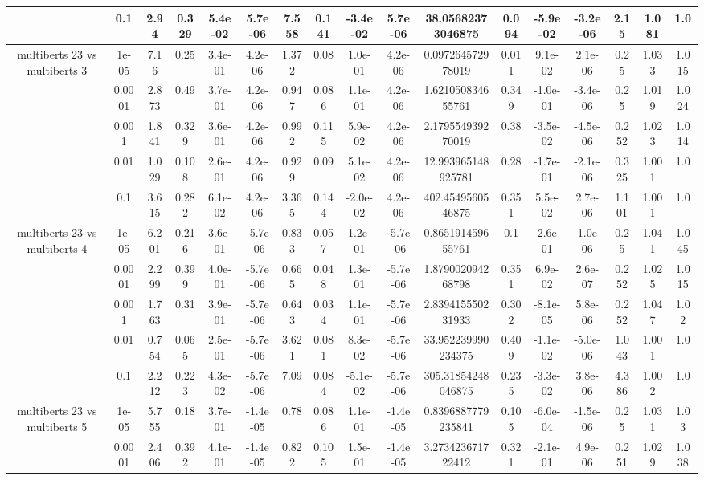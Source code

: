 \begin{tabular}{|c|c|c|c|c|c|c|c|c|c|c|c|c|c|c|c|c|}
 & 0.1 & 2.94 & 0.329 & 5.4e-02 & 5.7e-06 & 7.558 & 0.141 & -3.4e-02 & 5.7e-06 & 38.05682373046875 & 0.094 & -5.9e-02 & -3.2e-06 & 2.15 & 1.081 & 1.0 \\
\hline
\multirow{5}{*}{multiberts 23 vs multiberts 3} & 1e-05 & 7.16 & 0.25 & 3.4e-01 & 4.2e-06 & 1.372 & 0.08 & 1.0e-01 & 4.2e-06 & 0.097264572978019 & 0.011 & 9.1e-02 & 2.1e-06 & 0.25 & 1.033 & 1.015 \\
 & 0.0001 & 2.873 & 0.49 & 3.7e-01 & 4.2e-06 & 0.947 & 0.086 & 1.1e-01 & 4.2e-06 & 1.621050834655761 & 0.349 & -1.0e-01 & -3.4e-06 & 0.25 & 1.019 & 1.024 \\
 & 0.001 & 1.841 & 0.329 & 3.6e-01 & 4.2e-06 & 0.992 & 0.115 & 5.9e-02 & 4.2e-06 & 2.179554939270019 & 0.38 & -3.5e-02 & -4.5e-06 & 0.252 & 1.023 & 1.014 \\
 & 0.01 & 1.029 & 0.108 & 2.6e-01 & 4.2e-06 & 0.929 & 0.09 & 5.1e-02 & 4.2e-06 & 12.993965148925781 & 0.28 & -1.7e-01 & -2.1e-06 & 0.325 & 1.001 & 1.0 \\
 & 0.1 & 3.615 & 0.282 & 6.1e-02 & 4.2e-06 & 3.365 & 0.144 & -2.0e-02 & 4.2e-06 & 402.4549560546875 & 0.351 & 5.5e-02 & 2.7e-06 & 1.101 & 1.001 & 1.0 \\
\hline
\multirow{5}{*}{multiberts 23 vs multiberts 4} & 1e-05 & 6.201 & 0.216 & 3.6e-01 & -5.7e-06 & 0.833 & 0.057 & 1.2e-01 & -5.7e-06 & 0.865191459655761 & 0.1 & -2.6e-01 & -1.0e-06 & 0.25 & 1.041 & 1.045 \\
 & 0.0001 & 2.299 & 0.399 & 4.0e-01 & -5.7e-06 & 0.665 & 0.048 & 1.3e-01 & -5.7e-06 & 1.879002094268798 & 0.351 & 6.9e-02 & 2.6e-07 & 0.252 & 1.025 & 1.015 \\
 & 0.001 & 1.763 & 0.31 & 3.9e-01 & -5.7e-06 & 0.643 & 0.034 & 1.1e-01 & -5.7e-06 & 2.839415550231933 & 0.302 & -8.1e-05 & 5.8e-06 & 0.252 & 1.047 & 1.02 \\
 & 0.01 & 0.754 & 0.065 & 2.5e-01 & -5.7e-06 & 3.621 & 0.081 & 8.3e-02 & -5.7e-06 & 33.952239990234375 & 0.409 & -1.1e-02 & -5.0e-06 & 1.043 & 1.001 & 1.0 \\
 & 0.1 & 2.212 & 0.223 & 4.3e-02 & -5.7e-06 & 7.09 & 0.084 & -5.1e-02 & -5.7e-06 & 305.31854248046875 & 0.235 & -3.3e-02 & 3.8e-06 & 4.386 & 1.002 & 1.0 \\
\hline
\multirow{5}{*}{multiberts 23 vs multiberts 5} & 1e-05 & 5.755 & 0.18 & 3.7e-01 & -1.4e-05 & 0.78 & 0.086 & 1.1e-01 & -1.4e-05 & 0.8396887779235841 & 0.105 & -6.0e-04 & -1.5e-06 & 0.25 & 1.031 & 1.03 \\
 & 0.0001 & 2.406 & 0.392 & 4.1e-01 & -1.4e-05 & 0.822 & 0.105 & 1.5e-01 & -1.4e-05 & 3.273423671722412 & 0.321 & -2.1e-01 & 4.9e-06 & 0.251 & 1.029 & 1.038 \\

\end{tabular}
